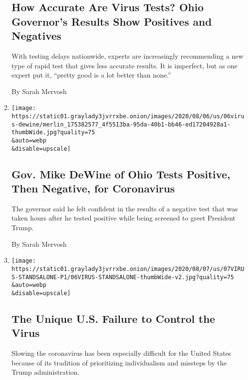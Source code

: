 \begin{enumerate}
  \hypertarget{how-accurate-are-virus-tests-ohio-governors-results-show-positives-and-negatives}{%
  \subsection{How Accurate Are Virus Tests? Ohio Governor's Results Show
  Positives and
  Negatives}\label{how-accurate-are-virus-tests-ohio-governors-results-show-positives-and-negatives}}

  With testing delays nationwide, experts are increasingly recommending
  a new type of rapid test that gives less accurate results. It is
  imperfect, but as one expert put it, ``pretty good is a lot better
  than none.''

  By Sarah Mervosh
\item
  \href{/2020/08/06/us/mike-dewine-coronavirus.html}{}

  \texttt{[image: https://static01.graylady3jvrrxbe.onion/images/2020/08/06/us/06virus-dewine/merlin\_175382577\_4f5513ba-95da-40b1-bb46-ed17204928a1-thumbWide.jpg?quality=75\\\&auto=webp\\\&disable=upscale]}

  \hypertarget{gov-mike-dewine-of-ohio-tests-positive-then-negative-for-coronavirus}{%
  \subsection{Gov. Mike DeWine of Ohio Tests Positive, Then Negative,
  for
  Coronavirus}\label{gov-mike-dewine-of-ohio-tests-positive-then-negative-for-coronavirus}}

  The governor said he felt confident in the results of a negative test
  that was taken hours after he tested positive while being screened to
  greet President Trump.

  By Sarah Mervosh
\item
  \href{/2020/08/06/us/coronavirus-us.html}{}

  \texttt{[image: https://static01.graylady3jvrrxbe.onion/images/2020/08/07/us/07VIRUS-STANDSALONE-P1/06VIRUS-STANDSALONE-thumbWide-v2.jpg?quality=75\\\&auto=webp\\\&disable=upscale]}

  \hypertarget{the-unique-us-failure-to-control-the-virus}{%
  \subsection{The Unique U.S. Failure to Control the
  Virus}\label{the-unique-us-failure-to-control-the-virus}}

  Slowing the coronavirus has been especially difficult for the United
  States because of its tradition of prioritizing individualism and
  missteps by the Trump administration.


\end{enumerate}
